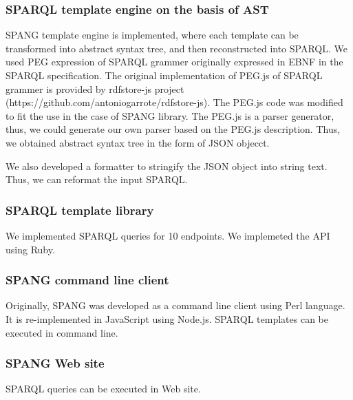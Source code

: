 \documentclass[runningheads]{llncs}
\begin{document}
\subsubsection{SPARQL template engine on the basis of AST}
SPANG template engine is implemented, where each template can be transformed into abstract syntax tree, and then reconstructed into SPARQL. 
We used PEG expression of SPARQL grammer originally expressed in EBNF in the SPARQL specification. The original implementation of PEG.js of SPARQL grammer is provided by rdfstore-js project (https://github.com/antoniogarrote/rdfstore-js).
The PEG.js code was modified to fit the use in the case of SPANG library.
The PEG.js is a parser generator, thus, we could generate our own parser based on the PEG.js description. Thus, we obtained abstract syntax tree in the form of JSON objecct.

We also developed a formatter to stringify the JSON object into string text. Thus, we can reformat the input SPARQL.

\subsubsection{SPARQL template library}
We implemented SPARQL queries for 10 endpoints.
We implemeted the API using Ruby.

\subsubsection{SPANG command line client}
Originally, SPANG was developed as a command line client using Perl language.
It is re-implemented in JavaScript using Node.js.
SPARQL templates can be executed in command line.

\subsubsection{SPANG Web site}
SPARQL queries can be executed in Web site.






\end{document}
